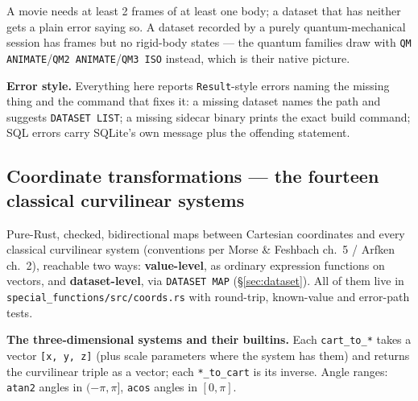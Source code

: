 \documentclass[11pt]{article}
\newcommand{\kw}[1]{\texttt{\uppercase{#1}}}
\newcommand{\code}[1]{\texttt{#1}}
\begin{document}
A movie needs at least 2 frames of at least one body; a dataset that
has neither gets a plain error saying so. A dataset recorded by a
purely quantum-mechanical session has frames but no rigid-body states
--- the quantum families draw with
\code{QM ANIMATE}/\code{QM2 ANIMATE}/\code{QM3 ISO} instead, which is
their native picture.

\textbf{Error style.} Everything here reports \code{Result}-style
errors naming the missing thing and the command that fixes it: a
missing dataset names the path and suggests \kw{dataset list}; a
missing sidecar binary prints the exact build command; SQL errors
carry SQLite's own message plus the offending statement.

\subsection{Coordinate transformations --- the fourteen classical
curvilinear systems}
\label{sec:coords}

Pure-Rust, checked, bidirectional maps between Cartesian coordinates
and every classical curvilinear system (conventions per Morse \&
Feshbach ch.~5 / Arfken ch.~2), reachable two ways:
\textbf{value-level}, as ordinary expression functions on vectors, and
\textbf{dataset-level}, via \kw{dataset map} (\S\ref{sec:dataset}).
All of them live in \code{special\_functions/src/coords.rs} with
round-trip, known-value and error-path tests.

\textbf{The three-dimensional systems and their builtins.} Each
\code{cart\_to\_*} takes a vector \code{[x, y, z]} (plus scale
parameters where the system has them) and returns the curvilinear
triple as a vector; each \code{*\_to\_cart} is its inverse. Angle
ranges: \code{atan2} angles in $(-\pi, \pi]$, \code{acos} angles in
$[0, \pi]$.
\end{document}
